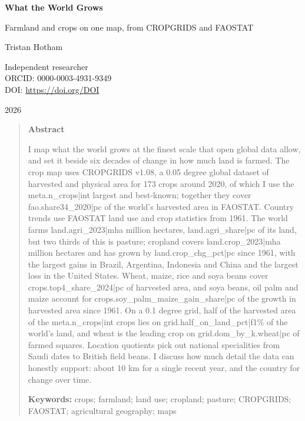 \documentclass[11pt,a4paper]{article}
\begin{document}
\begin{center}
{\Large\bfseries What the World Grows\par}
\vspace{0.4em}
{\large Farmland and crops on one map, from CROPGRIDS and FAOSTAT\par}
\vspace{1.2em}
{\large Tristan Hotham\par}
\vspace{0.3em}
{\small Independent researcher\\
ORCID: 0000-0003-4931-9349\\
DOI: \href{https://doi.org/{{DOI}}}{https://doi.org/{{DOI}}}\par}
\vspace{0.8em}
2026
\end{center}

\begin{quote}
\small
\begin{center}\textbf{Abstract}\end{center}
I map what the world grows at the finest scale that open global data allow, and set it beside six decades of change in how much land is farmed. The crop map uses CROPGRIDS v1.08, a 0.05 degree global dataset of harvested and physical area for 173 crops around 2020, of which I use the {{meta.n_crops|int}} largest and best-known; together they cover {{fao.share34_2020|pc}} of the world's harvested area in FAOSTAT. Country trends use FAOSTAT land use and crop statistics from 1961. The world farms {{land.agri_2023|mha}} million hectares, {{land.agri_share|pc}} of its land, but two thirds of this is pasture; cropland covers {{land.crop_2023|mha}} million hectares and has grown by {{land.crop_chg_pct|pc}} since 1961, with the largest gains in Brazil, Argentina, Indonesia and China and the largest loss in the United States. Wheat, maize, rice and soya beans cover {{crops.top4_share_2024|pc}} of harvested area, and soya beans, oil palm and maize account for {{crops.soy_palm_maize_gain_share|pc}} of the growth in harvested area since 1961. On a 0.1 degree grid, half of the harvested area of the {{meta.n_crops|int}} crops lies on {{grid.half_on_land_pct|f1}}\% of the world's land, and wheat is the leading crop on {{grid.dom_by_k.wheat|pc}} of farmed squares. Location quotients pick out national specialities from Saudi dates to British field beans. I discuss how much detail the data can honestly support: about 10 km for a single recent year, and the country for change over time.

\textbf{Keywords:} crops; farmland; land use; cropland; pasture; CROPGRIDS; FAOSTAT; agricultural geography; maps
\end{quote}
\end{document}

